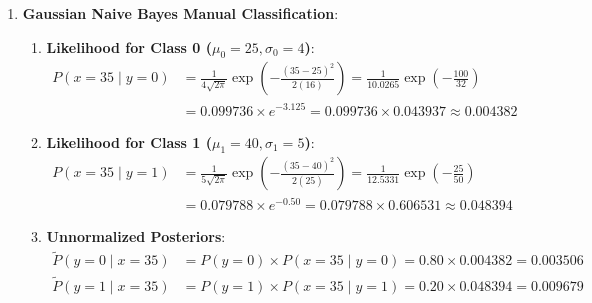 \begin{enumerate}
\begin{enumerate}[label=(\alph*)]
        \item \textbf{Prediction for $k = 1$}:
        The single closest neighbor is Point $B$ with distance $1.0440$. Point $B$ belongs to Class $0$. 
        Therefore, $k\text{-NN}$ predicts **Class 0 (Normal)**.

        \item \textbf{Prediction for $k = 3$}:
        The three closest neighbors in ascending order of distance are:
        \begin{enumerate}
            \item Point $B$ ($d \approx 1.044$, Class $0$)
            \item Point $C$ ($d \approx 2.062$, Class $1$)
            \item Point $A$ ($d \approx 3.041$, Class $0$)
        \end{enumerate}
        Voting tally: $2$ votes for Class $0$, $1$ vote for Class $1$. 
        Plurality vote predicts **Class 0 (Normal)**.
    \end{enumerate}

    \item \textbf{Gaussian Naive Bayes Manual Classification}:
    \begin{enumerate}[label=(\alph*)]
        \item \textbf{Likelihood for Class 0 ($\mu_0 = 25, \sigma_0 = 4$)}:
        \begin{align*}
        P(x=35 \mid y=0) &= \frac{1}{4\sqrt{2\pi}} \exp\left( -\frac{(35 - 25)^2}{2(16)} \right) = \frac{1}{10.0265} \exp\left(-\frac{100}{32}\right) \\
        &= 0.099736 \times e^{-3.125} = 0.099736 \times 0.043937 \approx \mathbf{0.004382}
        \end{align*}

        \item \textbf{Likelihood for Class 1 ($\mu_1 = 40, \sigma_1 = 5$)}:
        \begin{align*}
        P(x=35 \mid y=1) &= \frac{1}{5\sqrt{2\pi}} \exp\left( -\frac{(35 - 40)^2}{2(25)} \right) = \frac{1}{12.5331} \exp\left(-\frac{25}{50}\right) \\
        &= 0.079788 \times e^{-0.50} = 0.079788 \times 0.606531 \approx \mathbf{0.048394}
        \end{align*}

        \item \textbf{Unnormalized Posteriors}:
        \begin{align*}
        \tilde{P}(y=0 \mid x=35) &= P(y=0) \times P(x=35 \mid y=0) = 0.80 \times 0.004382 = \mathbf{0.003506} \\
        \tilde{P}(y=1 \mid x=35) &= P(y=1) \times P(x=35 \mid y=1) = 0.20 \times 0.048394 = \mathbf{0.009679}
        \end{align*}


\end{enumerate}
\end{enumerate}
